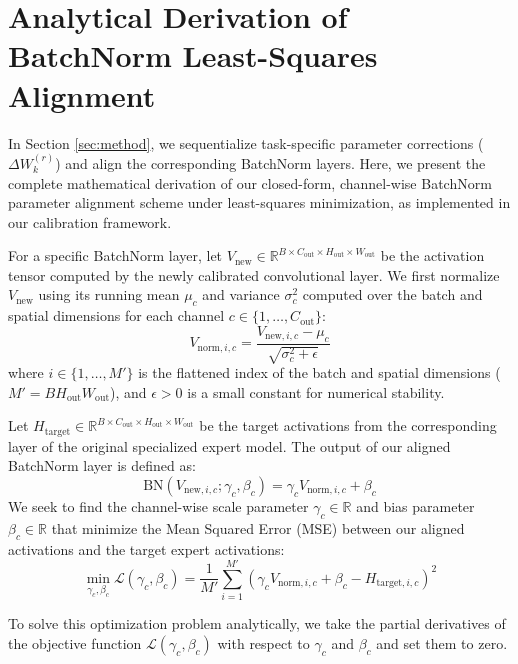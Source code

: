 \documentclass{article}
\theoremstyle{plain}
\theoremstyle{definition}
\theoremstyle{remark}
\begin{document}
\section{Analytical Derivation of BatchNorm Least-Squares Alignment}
\label{app:bn_derivation}
In Section \ref{sec:method}, we sequentialize task-specific parameter corrections ($\Delta W_k^{(r)}$) and align the corresponding BatchNorm layers. Here, we present the complete mathematical derivation of our closed-form, channel-wise BatchNorm parameter alignment scheme under least-squares minimization, as implemented in our calibration framework.

For a specific BatchNorm layer, let $V_{\text{new}} \in \mathbb{R}^{B \times C_{\text{out}} \times H_{\text{out}} \times W_{\text{out}}}$ be the activation tensor computed by the newly calibrated convolutional layer. We first normalize $V_{\text{new}}$ using its running mean $\mu_c$ and variance $\sigma_c^2$ computed over the batch and spatial dimensions for each channel $c \in \{1, \ldots, C_{\text{out}}\}$:
\begin{equation}
    V_{\text{norm}, i, c} = \frac{V_{\text{new}, i, c} - \mu_c}{\sqrt{\sigma_c^2 + \epsilon}}
\end{equation}
where $i \in \{1, \ldots, M'\}$ is the flattened index of the batch and spatial dimensions ($M' = B H_{\text{out}} W_{\text{out}}$), and $\epsilon > 0$ is a small constant for numerical stability.

Let $H_{\text{target}} \in \mathbb{R}^{B \times C_{\text{out}} \times H_{\text{out}} \times W_{\text{out}}}$ be the target activations from the corresponding layer of the original specialized expert model. The output of our aligned BatchNorm layer is defined as:
\begin{equation}
    \text{BN}(V_{\text{new}, i, c}; \gamma_c, \beta_c) = \gamma_c V_{\text{norm}, i, c} + \beta_c
\end{equation}
We seek to find the channel-wise scale parameter $\gamma_c \in \mathbb{R}$ and bias parameter $\beta_c \in \mathbb{R}$ that minimize the Mean Squared Error (MSE) between our aligned activations and the target expert activations:
\begin{equation}
    \min_{\gamma_c, \beta_c} \mathcal{L}(\gamma_c, \beta_c) = \frac{1}{M'} \sum_{i=1}^{M'} \left( \gamma_c V_{\text{norm}, i, c} + \beta_c - H_{\text{target}, i, c} \right)^2
\end{equation}

To solve this optimization problem analytically, we take the partial derivatives of the objective function $\mathcal{L}(\gamma_c, \beta_c)$ with respect to $\gamma_c$ and $\beta_c$ and set them to zero.
\end{document}
